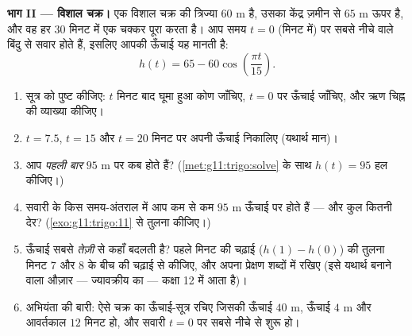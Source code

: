 \begin{problem}
\medskip
\noindent\textbf{भाग II --- विशाल चक्र।}
एक विशाल चक्र की त्रिज्या $60$ m है, उसका केंद्र ज़मीन से $65$ m ऊपर है,
और वह हर $30$ मिनट में एक चक्कर पूरा करता है। आप समय $t = 0$ (मिनट में) पर
सबसे नीचे वाले बिंदु से सवार होते हैं, इसलिए आपकी ऊँचाई यह मानती है:
\[
h(t) = 65 - 60 \cos\!\left(\frac{\pi t}{15}\right).
\]
\begin{enumerate}[resume]
  \item सूत्र को पुष्ट कीजिए: $t$ मिनट बाद घूमा हुआ कोण जाँचिए, $t = 0$ पर
        ऊँचाई जाँचिए, और ऋण चिह्न की व्याख्या कीजिए।
  \item $t = 7.5$, $t = 15$ और $t = 20$ मिनट पर अपनी ऊँचाई निकालिए (यथार्थ मान)।
  \item आप \emph{पहली बार} $95$ m पर कब होते हैं? (\cref{met:g11:trigo:solve} के साथ $h(t) = 95$ हल
        कीजिए।)
  \item सवारी के किस समय-अंतराल में आप कम से कम $95$ m ऊँचाई पर होते हैं
        --- और कुल कितनी देर? (\cref{exo:g11:trigo:11} से तुलना कीजिए।)
  \item ऊँचाई सबसे \emph{तेज़ी} से कहाँ बदलती है? पहले मिनट की चढ़ाई ($h(1) - h(0)$)
        की तुलना मिनट $7$ और $8$ के बीच की चढ़ाई से कीजिए, और अपना
        प्रेक्षण शब्दों में रखिए (इसे यथार्थ बनाने वाला औज़ार ---
        ज्यावक्रीय  का  --- कक्षा 12 में आता है)।
  \item अभियंता की बारी: ऐसे चक्र का ऊँचाई-सूत्र रचिए जिसकी  ऊँचाई
        $40$ m,  ऊँचाई $4$ m और आवर्तकाल $12$ मिनट हो, और सवारी
        $t = 0$ पर सबसे नीचे से शुरू हो।
\end{enumerate}


\end{problem}
